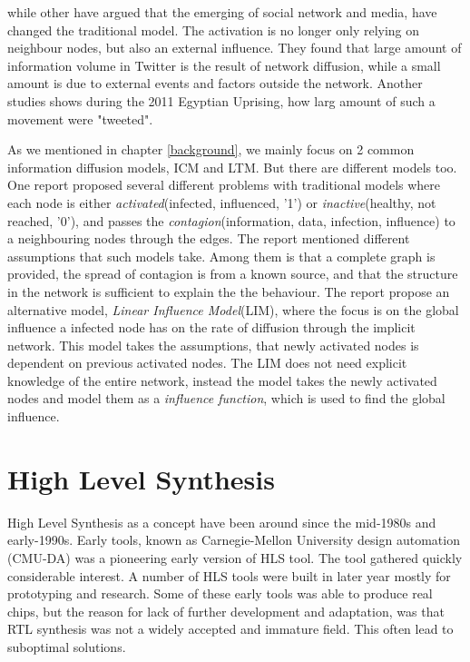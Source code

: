 while other\cite{InfoDiffAndExternalInfluInNetworks} have argued that the emerging of social network and media, have changed the traditional model. The activation is no longer only relying on neighbour nodes, but also an external influence. They found that large amount of  information volume in Twitter is the result of network diffusion, while a small amount is due to external events and factors outside the network\citep{InfoDiffAndExternalInfluInNetworks}. Another studies shows during the 2011 Egyptian Uprising, how larg amount of such a movement were "tweeted"\cite{Starbird:2012:RRI:2145204.2145212}.


As we mentioned in chapter \ref{background}, we mainly focus on 2 common information diffusion models, ICM and LTM. But there are different models too. One report\cite{5694014} proposed several different problems with traditional models where each node is either \textit{activated}(infected, influenced, '1') or \textit{inactive}(healthy, not reached, '0'), and passes the \textit{contagion}(information, data, infection, influence) to a neighbouring nodes through the edges. The report mentioned different assumptions that such models take. Among them is that a complete graph is provided, the spread of contagion is from a known source, and that the structure in the network is sufficient to explain the the behaviour\citep{5694014}. The report propose an alternative model, \textit{Linear Influence Model}(LIM), where the focus is on the global influence a infected node has on the rate of diffusion through the implicit network. This model takes the assumptions, that newly activated nodes is dependent on previous activated nodes. The LIM does not need explicit knowledge of the entire network, instead the model takes the newly activated nodes and model them as a \textit{influence function}, which is used to find the global influence. 	



\section{High Level Synthesis}
High Level Synthesis as a concept have been around since the mid-1980s and early-1990s. Early tools, known as Carnegie-Mellon University design automation (CMU-DA)\citep{1085036}\citep{Parker:1979:CDA:800292.811694} was a pioneering early version of HLS tool. The tool gathered quickly considerable interest. A number of HLS tools were built in later year mostly for prototyping and research\cite{Granacki:1985:AAD:317825.317970}\citep{Paulin:1986:HMA:318013.318055}\citep{4069894}. Some of these early tools was able to produce real chips, but the reason for lack of further development and adaptation, was that RTL synthesis was not a widely accepted and immature field. This often lead to suboptimal solutions. 

